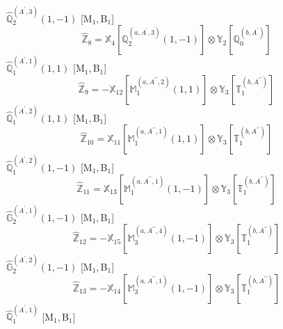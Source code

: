 \documentclass[fleqn,10pt,landscape]{article}
\begin{document}
\begin{itemize}
\begin{dmath*}
\end{dmath*}
\vspace{4mm}
\noindent {} $\,\,\,\hat{\mathbb{Q}}_{2}^{(A^{\prime},3)}(1,-1)$ [M$_{1}$,\,B$_{1}$]
\begin{dmath*}
\hat{\mathbb{Z}}_{8}=\mathbb{X}_{4}[\mathbb{Q}_{2}^{(a,A^{\prime},3)}(1,-1)] \otimes\mathbb{Y}_{2}[\mathbb{Q}_{0}^{(b,A^{\prime})}]
\end{dmath*}
\vspace{4mm}
\noindent {} $\,\,\,\hat{\mathbb{Q}}_{1}^{(A^{\prime},1)}(1,1)$ [M$_{1}$,\,B$_{1}$]
\begin{dmath*}
\hat{\mathbb{Z}}_{9}=- \mathbb{X}_{12}[\mathbb{M}_{1}^{(a,A^{\prime\prime},2)}(1,1)] \otimes\mathbb{Y}_{3}[\mathbb{T}_{1}^{(b,A^{\prime\prime})}]
\end{dmath*}
\vspace{4mm}
\noindent {} $\,\,\,\hat{\mathbb{Q}}_{1}^{(A^{\prime},2)}(1,1)$ [M$_{1}$,\,B$_{1}$]
\begin{dmath*}
\hat{\mathbb{Z}}_{10}=\mathbb{X}_{11}[\mathbb{M}_{1}^{(a,A^{\prime\prime},1)}(1,1)] \otimes\mathbb{Y}_{3}[\mathbb{T}_{1}^{(b,A^{\prime\prime})}]
\end{dmath*}
\vspace{4mm}
\noindent {} $\,\,\,\hat{\mathbb{Q}}_{1}^{(A^{\prime},2)}(1,-1)$ [M$_{1}$,\,B$_{1}$]
\begin{dmath*}
\hat{\mathbb{Z}}_{11}=\mathbb{X}_{13}[\mathbb{M}_{1}^{(a,A^{\prime\prime},1)}(1,-1)] \otimes\mathbb{Y}_{3}[\mathbb{T}_{1}^{(b,A^{\prime\prime})}]
\end{dmath*}
\vspace{4mm}
\noindent {} $\,\,\,\hat{\mathbb{G}}_{2}^{(A^{\prime},1)}(1,-1)$ [M$_{1}$,\,B$_{1}$]
\begin{dmath*}
\hat{\mathbb{Z}}_{12}=- \mathbb{X}_{15}[\mathbb{M}_{3}^{(a,A^{\prime\prime},4)}(1,-1)] \otimes\mathbb{Y}_{3}[\mathbb{T}_{1}^{(b,A^{\prime\prime})}]
\end{dmath*}
\vspace{4mm}
\noindent {} $\,\,\,\hat{\mathbb{G}}_{2}^{(A^{\prime},2)}(1,-1)$ [M$_{1}$,\,B$_{1}$]
\begin{dmath*}
\hat{\mathbb{Z}}_{13}=- \mathbb{X}_{14}[\mathbb{M}_{3}^{(a,A^{\prime\prime},1)}(1,-1)] \otimes\mathbb{Y}_{3}[\mathbb{T}_{1}^{(b,A^{\prime\prime})}]
\end{dmath*}
\vspace{4mm}
\noindent {} $\,\,\,\hat{\mathbb{Q}}_{1}^{(A^{\prime},1)}$ [M$_{1}$,\,B$_{1}$]

\end{itemize}
\end{document}
